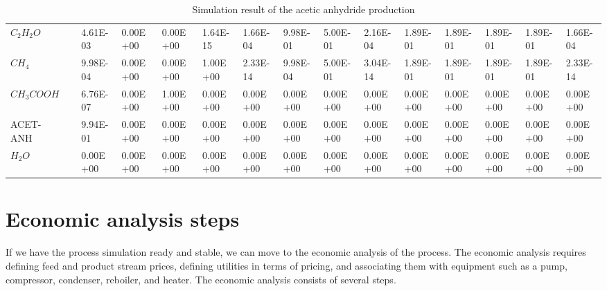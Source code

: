 \begin{table}[h!]
{\begin{tabular}{ll|lllllllllllll}
			$C_2H_2O$          &         & 4.61E-03 & 0.00E+00 & 0.00E+00 & 1.64E-15  & 1.66E-04 & 9.98E-01 & 5.00E-01  & 2.16E-04 & 1.89E-01 & 1.89E-01 & 1.89E-01 & 1.89E-01 & 1.66E-04 \\
			$CH_4$            &         & 9.98E-04 & 0.00E+00 & 0.00E+00 & 1.00E+00  & 2.33E-14 & 9.98E-04 & 5.00E-01  & 3.04E-14 & 1.89E-01 & 1.89E-01 & 1.89E-01 & 1.89E-01 & 2.33E-14 \\
			$CH_3COOH$        &         & 6.76E-07 & 0.00E+00 & 1.00E+00 & 0.00E+00  & 0.00E+00 & 0.00E+00 & 0.00E+00  & 0.00E+00 & 0.00E+00 & 0.00E+00 & 0.00E+00 & 0.00E+00 & 0.00E+00 \\
			ACET-ANH       &         & 9.94E-01 & 0.00E+00 & 0.00E+00 & 0.00E+00  & 0.00E+00 & 0.00E+00 & 0.00E+00  & 0.00E+00 & 0.00E+00 & 0.00E+00 & 0.00E+00 & 0.00E+00 & 0.00E+00 \\
			$H_2O$          &         & 0.00E+00 & 0.00E+00 & 0.00E+00 & 0.00E+00  & 0.00E+00 & 0.00E+00 & 0.00E+00  & 0.00E+00 & 0.00E+00 & 0.00E+00 & 0.00E+00 & 0.00E+00 & 0.00E+00
		\end{tabular} }
	\caption{Simulation result of the acetic anhydride production}
	\label{tab:Acet_Simu_Result_Basic}
	\end{table}

	\section{Economic analysis steps}

	If we have the process simulation ready and stable, we can move to the economic analysis of the process. The economic analysis requires defining feed and product stream prices, defining utilities in terms of pricing, and associating them with equipment such as a pump, compressor, condenser, reboiler, and heater. The economic analysis consists of several steps.
	
